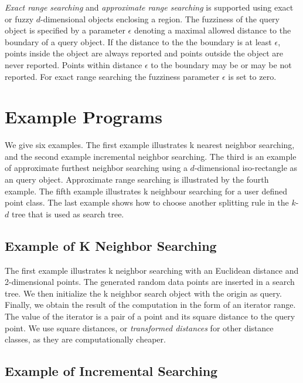 {\em Exact range searching} and {\em approximate range searching} is
supported using exact or fuzzy $d$-dimensional objects enclosing a
region.  The fuzziness of the query object is specified by a parameter
$\epsilon$ denoting a maximal allowed distance to the boundary of a
query object.  If the distance to the the boundary is at least
$\epsilon$, points inside the object are always reported and points
outside the object are never reported. Points within distance
$\epsilon$ to the boundary may be or may be not reported.  For exact
range searching the fuzziness parameter $\epsilon$ is set to zero.


\section{Example Programs}

We give six examples.  The first example illustrates k nearest neighbor
searching, and the second example incremental neighbor searching. 
The third is an example of approximate furthest neighbor searching
using a $d$-dimensional iso-rectangle as an query object.  Approximate
range searching is illustrated by the fourth example.  The fifth
example illustrates k neighbour searching for a user defined point
class. The last example shows how to choose another splitting rule in the
$k$-$d$ tree that is used as search tree.

\newpage
\subsection{Example of K Neighbor Searching}

The first example illustrates k neighbor searching with an Euclidean
distance and 2-dimensional points. The generated random
data points are inserted in a search tree. We then initialize
the k neighbor search object with the origin as query. Finally, we 
obtain the result of the computation in the form of an iterator
range. The value of the iterator is a pair of a point and its square
distance to the query point. We use square distances, or {\em
transformed distances} for other distance classes, as they are 
computationally cheaper.


\newpage
\subsection{Example of Incremental Searching}

